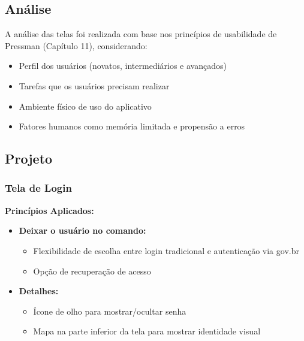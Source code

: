 \documentclass[a5paper, 12pt]{article}
\begin{document}
\subsection{Análise}
A análise das telas foi realizada com base nos princípios de usabilidade de Pressman (Capítulo 11), considerando:
\begin{itemize}
\item Perfil dos usuários (novatos, intermediários e avançados)
\item Tarefas que os usuários precisam realizar
\item Ambiente físico de uso do aplicativo
\item Fatores humanos como memória limitada e propensão a erros
\end{itemize}

\subsection{Projeto}
\subsubsection{Tela de Login}
\textbf{Princípios Aplicados:}
\begin{itemize}[leftmargin=*]
    \item \textbf{Deixar o usuário no comando:}
    \begin{itemize}
        \item Flexibilidade de escolha entre login tradicional e autenticação via gov.br
        \item Opção de recuperação de acesso
    \end{itemize}

    \item \textbf{Detalhes:}
    \begin{itemize}
        \item Ícone de olho para mostrar/ocultar senha
        \item Mapa na parte inferior da tela para mostrar identidade visual
    \end{itemize}
\end{itemize}
\end{document}
